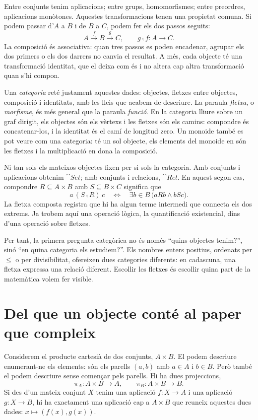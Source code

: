 Entre conjunts tenim aplicacions; entre grups, homomorfismes; entre
preordres, aplicacions monòtones. Aquestes transformacions tenen una
propietat comuna. Si podem passar d'$A$ a $B$ i de $B$ a $C$, podem fer els
dos passos seguits:
\[
  A\xrightarrow{f}B\xrightarrow{g}C,
  \qquad g\comp f\colon A\longrightarrow C.
\]
La composició és associativa: quan tres passos es poden encadenar, agrupar
els dos primers o els dos darrers no canvia el resultat. A més, cada objecte
té una transformació identitat, que el deixa com és i no altera cap altra
transformació quan s'hi compon.

Una \emph{categoria} reté justament aquestes dades: objectes, fletxes entre
objectes, composició i identitats, amb les lleis que acabem de descriure.
La paraula \emph{fletxa}, o \emph{morfisme}, és més general que la paraula
\emph{funció}. En la categoria lliure sobre un graf dirigit, els objectes
són els vèrtexs i les fletxes són els camins: compondre és concatenar-los,
i la identitat és el camí de longitud zero. Un monoide també es pot veure
com una categoria: té un sol objecte, els elements del monoide en són les
fletxes i la multiplicació en dona la composició.

Ni tan sols els mateixos objectes fixen per si sols la categoria. Amb
conjunts i aplicacions obtenim $\cat{Set}$; amb conjunts i relacions,
$\cat{Rel}$. En aquest segon cas, compondre $R\subseteq A\times B$ amb
$S\subseteq B\times C$ significa que
\[
  a\,(S\comp R)\,c
  \quad\Longleftrightarrow\quad
  \exists b\in B\,\bigl(aRb\land bSc\bigr).
\]
La fletxa composta registra que hi ha algun terme intermedi que connecta
els dos extrems. Ja trobem aquí una operació lògica, la quantificació
existencial, dins d'una operació sobre fletxes.

Per tant, la primera pregunta categòrica no és només \enquote{quins objectes tenim?},
sinó \enquote{en quina categoria els estudiem?}. Els nombres enters positius,
ordenats per $\leq$ o per divisibilitat, ofereixen dues categories diferents:
en cadascuna, una fletxa expressa una relació diferent. Escollir les fletxes
és escollir quina part de la matemàtica volem fer visible.

\section{Del que un objecte conté al paper que compleix}

Considerem el producte cartesià de dos conjunts, $A\times B$. El podem
descriure enumerant-ne els elements: són els parells $(a,b)$ amb $a\in A$
i $b\in B$. Però també el podem descriure sense començar pels parells.
Hi ha dues projeccions,
\[
  \pi_A\colon A\times B\longrightarrow A,
  \qquad \pi_B\colon A\times B\longrightarrow B.
\]
Si des d'un mateix conjunt $X$ tenim una aplicació $f\colon X\to A$ i una
aplicació $g\colon X\to B$, hi ha exactament una aplicació cap a $A\times B$
que reuneix aquestes dues dades: $x\mapsto(f(x),g(x))$.

